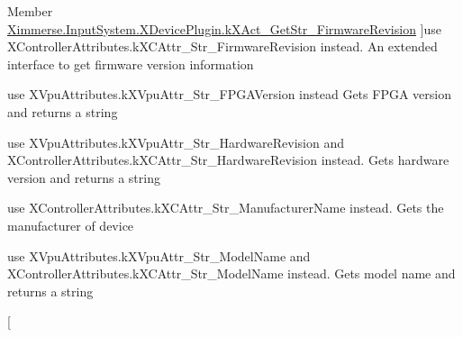 \begin{DoxyRefList}
%
Member \mbox{\hyperlink{class_ximmerse_1_1_input_system_1_1_x_device_plugin_ab7f817a86e5b3af956089fb089b7d0c3a41acdf2079bd9b63d7c4e00cb47b5915}{Ximmerse.Input\+System.X\+Device\+Plugin.k\+X\+Act\+\_\+\+Get\+Str\+\_\+\+Firmware\+Revision}} ]use X\+Controller\+Attributes.\+k\+X\+C\+Attr\+\_\+\+Str\+\_\+\+Firmware\+Revision instead. An extended interface to get firmware version information  
\item[\label{deprecated__deprecated000018}%
\Hypertarget{deprecated__deprecated000018}%
Member \mbox{\hyperlink{class_ximmerse_1_1_input_system_1_1_x_device_plugin_ab7f817a86e5b3af956089fb089b7d0c3a05aca0d3a85ffbd8676c1aab8b09e010}{Ximmerse.Input\+System.X\+Device\+Plugin.k\+X\+Act\+\_\+\+Get\+Str\+\_\+\+F\+P\+G\+A\+Version}} ]use X\+Vpu\+Attributes.\+k\+X\+Vpu\+Attr\+\_\+\+Str\+\_\+\+F\+P\+G\+A\+Version instead Gets F\+P\+GA version and returns a string  
\item[\label{deprecated__deprecated000017}%
\Hypertarget{deprecated__deprecated000017}%
Member \mbox{\hyperlink{class_ximmerse_1_1_input_system_1_1_x_device_plugin_ab7f817a86e5b3af956089fb089b7d0c3af20beece6504524adbcea8c4ff2e1f15}{Ximmerse.Input\+System.X\+Device\+Plugin.k\+X\+Act\+\_\+\+Get\+Str\+\_\+\+Hardware\+Revision}} ]use X\+Vpu\+Attributes.\+k\+X\+Vpu\+Attr\+\_\+\+Str\+\_\+\+Hardware\+Revision and X\+Controller\+Attributes.\+k\+X\+C\+Attr\+\_\+\+Str\+\_\+\+Hardware\+Revision instead. Gets hardware version and returns a string  
\item[\label{deprecated__deprecated000023}%
\Hypertarget{deprecated__deprecated000023}%
Member \mbox{\hyperlink{class_ximmerse_1_1_input_system_1_1_x_device_plugin_ab7f817a86e5b3af956089fb089b7d0c3ace545d1582bd87cdc08e8aef19e7231d}{Ximmerse.Input\+System.X\+Device\+Plugin.k\+X\+Act\+\_\+\+Get\+Str\+\_\+\+Manufacturer\+Name}} ]use X\+Controller\+Attributes.\+k\+X\+C\+Attr\+\_\+\+Str\+\_\+\+Manufacturer\+Name instead. Gets the manufacturer of device  
\item[\label{deprecated__deprecated000019}%
\Hypertarget{deprecated__deprecated000019}%
Member \mbox{\hyperlink{class_ximmerse_1_1_input_system_1_1_x_device_plugin_ab7f817a86e5b3af956089fb089b7d0c3a9750285b42fb8a64c8d2b166f0ea88f3}{Ximmerse.Input\+System.X\+Device\+Plugin.k\+X\+Act\+\_\+\+Get\+Str\+\_\+\+Model\+Name}} ]use X\+Vpu\+Attributes.\+k\+X\+Vpu\+Attr\+\_\+\+Str\+\_\+\+Model\+Name and X\+Controller\+Attributes.\+k\+X\+C\+Attr\+\_\+\+Str\+\_\+\+Model\+Name instead. Gets model name and returns a string  
\item[\label{deprecated__deprecated000022}%

\end{DoxyRefList}
